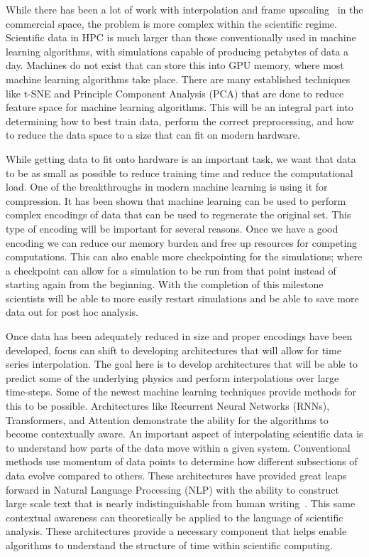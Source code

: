 \documentclass[12pt]{article}
\begin{document}
\noindent
While there has been a lot of work with interpolation and frame
upscaling~\cite{frame} in the commercial space, the problem is more complex within
the scientific regime. Scientific data in HPC is much larger than those
conventionally used in machine learning algorithms, with simulations capable of
producing petabytes of data a day.  Machines do not exist that can store this
into GPU memory, where most machine learning algorithms take place. There are
many established techniques like t-SNE and Principle Component Analysis (PCA)
that are done to reduce feature space for machine learning algorithms. This will
be an integral part into determining how to best train data, perform the correct
preprocessing, and how to reduce the data space to a size that can fit on modern
hardware.

\noindent
While getting data to fit onto hardware is an important task, we want that data
to be as small as possible to reduce training time and reduce the computational
load. One of the breakthroughs in modern machine learning is using it for
compression. It has been shown that machine learning can be used to perform
complex encodings of data that can be used to regenerate the original set. This
type of encoding will be important for several reasons. Once we have a good
encoding we can reduce our memory burden and free up resources for competing
computations. This can also enable more checkpointing for the simulations; where
a checkpoint can allow for a simulation to be run from that point instead of
starting again from the beginning. With the completion of this milestone
scientists will be able to more easily restart simulations and be able to save
more data out for post hoc analysis.

\noindent Once data has been adequately reduced in size and proper encodings
have been developed, focus can shift to developing architectures that will
allow for time series interpolation. The goal here is to develop architectures
that will be able to predict some of the underlying physics and perform
interpolations over large time-steps. Some of the newest machine learning
techniques provide methods for this to be possible. Architectures like
Recurrent Neural Networks (RNNs), Transformers, and Attention demonstrate the
ability for the algorithms to become contextually aware. An important aspect of
interpolating scientific data is to understand how parts of the data move
within a given system.  Conventional methods use momentum of data points to
determine how different subsections of data evolve compared to others. These
architectures have provided great leaps forward in Natural Language Processing
(NLP) with the ability to construct large scale text that is nearly
indistinguishable from human writing~\cite{radford2019language}. This same
contextual awareness can theoretically be applied to the language of scientific
analysis. These architectures provide a necessary component that helps enable
algorithms to understand the structure of time within scientific computing. 
\end{document}
